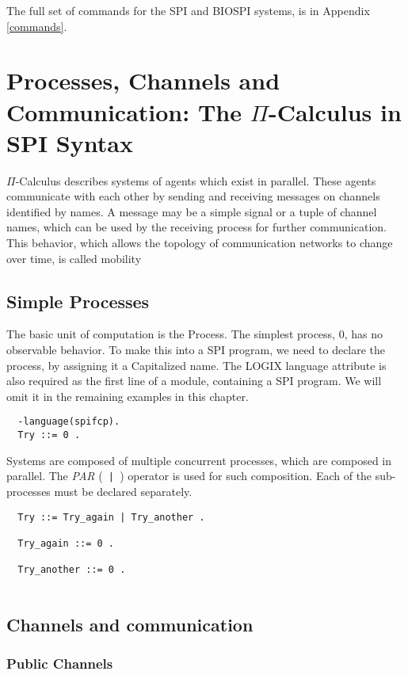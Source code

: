 The full set of commands for the SPI and BIOSPI systems, is in
Appendix \ref{commands}.

\chapter{Processes, Channels and Communication: The $\Pi$-Calculus in
SPI Syntax}
\label{syntax}

$\Pi$-Calculus describes systems of agents which exist in
parallel. These agents communicate with each other by sending and
receiving messages on channels identified by names. A message may
be a simple signal or a tuple of channel names, which can be used by the
receiving process for further communication. This behavior, which
allows the topology of communication networks to change over time, is
called mobility

\section{Simple Processes}

The basic unit of computation is the Process. The simplest process, 0,
has no observable behavior. To make this into a SPI program, we need
to declare the process, by assigning it a Capitalized name. The LOGIX
language attribute is also required as the first line of a module,
containing a SPI program. We
will omit it in the remaining examples in this chapter.

\begin{verbatim}
  -language(spifcp).
  Try ::= 0 .

\end{verbatim}

Systems are composed of multiple concurrent processes, which are
composed in parallel. The {\em PAR} (\verb+ | +) operator is used for such
composition. Each of the sub-processes must be declared separately.

\begin{verbatim}
  Try ::= Try_again | Try_another .

  Try_again ::= 0 .

  Try_another ::= 0 .
 
\end{verbatim}

\section{Channels and communication}

\subsection{Public Channels}

